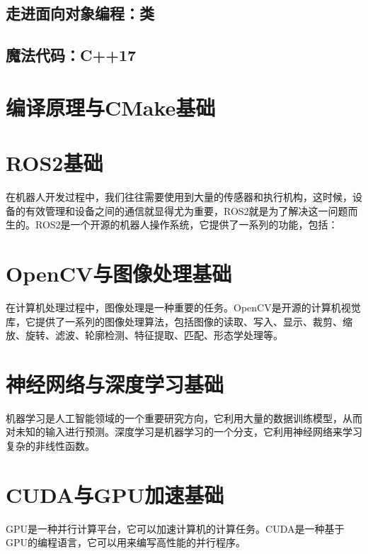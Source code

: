\documentclass[withoutpreface,bwprint]{cumcmthesis} %
\begin{document}
\subsection{走进面向对象编程：类}



\subsection{魔法代码：C++17}




\section{编译原理与CMake基础}



\section{ROS2基础}
在机器人开发过程中，我们往往需要使用到大量的传感器和执行机构，这时候，设备的有效管理和设备之间的通信就显得尤为重要，ROS2就是为了解决这一问题而生的。ROS2是一个开源的机器人操作系统，它提供了一系列的功能，包括：


\section{OpenCV与图像处理基础}
在计算机处理过程中，图像处理是一种重要的任务。OpenCV是开源的计算机视觉库，它提供了一系列的图像处理算法，包括图像的读取、写入、显示、裁剪、缩放、旋转、滤波、轮廓检测、特征提取、匹配、形态学处理等。

\section{神经网络与深度学习基础}
机器学习是人工智能领域的一个重要研究方向，它利用大量的数据训练模型，从而对未知的输入进行预测。深度学习是机器学习的一个分支，它利用神经网络来学习复杂的非线性函数。



\section{CUDA与GPU加速基础}
GPU是一种并行计算平台，它可以加速计算机的计算任务。CUDA是一种基于GPU的编程语言，它可以用来编写高性能的并行程序。


\end{document}
